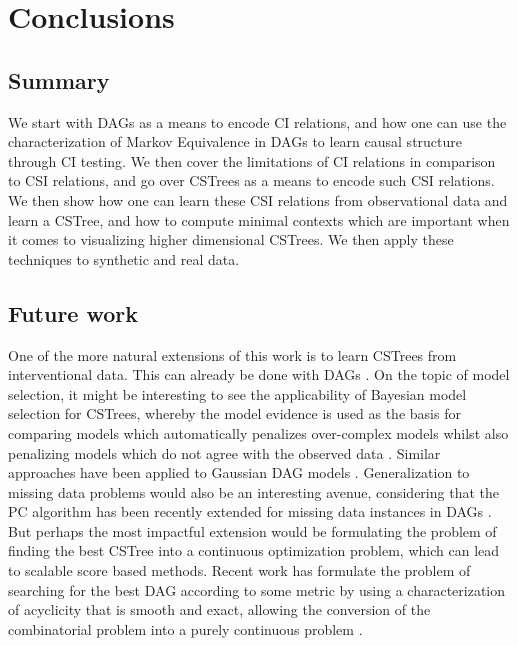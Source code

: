 \documentclass{tufte-book}
\begin{document}
\chapter{Conclusions}
\label{sec:orgba6578c}
\section{Summary}
\label{sec:org6671130}
We start with DAGs as a means to encode CI relations, and how one can use the characterization of Markov Equivalence in DAGs to learn causal structure through CI testing. We then cover the limitations of CI relations in comparison to CSI relations, and go over CSTrees as a means to encode such CSI relations. We then show how one can learn these CSI relations from observational data and learn a CSTree, and how to compute minimal contexts which are important when it comes to visualizing higher dimensional CSTrees. We then apply these techniques to synthetic and real data.


\section{Future work}
\label{sec:org6588be6}
One of the more natural extensions of this work is to learn CSTrees from interventional data. This can already be done with DAGs \cite{yang-2018-charac-learn}. On the topic of model selection, it might be interesting to see the applicability of Bayesian model selection for CSTrees, whereby the model evidence is used as the basis for comparing models which automatically penalizes over-complex models whilst also penalizing models which do not agree with the observed data \cite{mackay-1992-bayes-inter}. Similar approaches have been applied to Gaussian DAG models \cite{castelletti-2020-bayes-model}. Generalization to missing data problems would also be an interesting avenue, considering that the PC algorithm has been recently extended for missing data instances in DAGs \cite{tu-2019-causal-discov}. But perhaps the most impactful extension would be formulating the problem of finding the best CSTree into a continuous optimization problem, which can lead to scalable score based methods. Recent work has formulate the problem of searching for the best DAG according to some metric by using a characterization of acyclicity that is smooth and exact, allowing the conversion of the combinatorial problem into a purely continuous problem \cite{zheng-2018-dags-no-tears}.  
\end{document}
